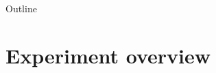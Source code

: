 \documentclass{beamer}
\begin{document}


\begin{frame}{}
\end{frame}

\begin{frame}{Outline}
  \tableofcontents
\end{frame}

\section{Experiment overview}

\end{document}

